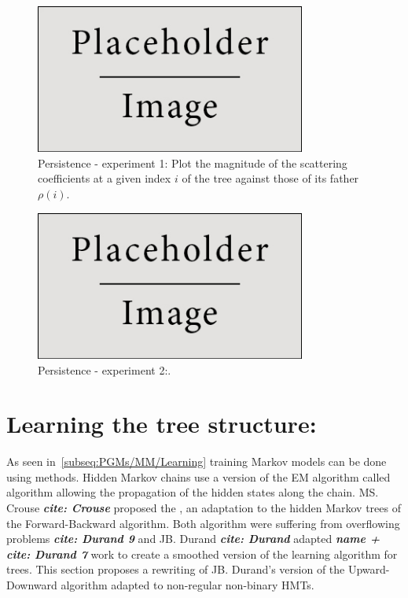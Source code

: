 \documentclass[a4paper,11pt]{report}
\begin{document}
{		\begin{figure}
				\begin{center}
					\includegraphics[width=3.5in]{placeholder.jpg}
					\caption[Persistence - experiment 1.]{Persistence - experiment 1: Plot the magnitude of the scattering coefficients at a given index $i$ of the tree against those of its father $\rho(i)$.} %
					\label{fig:Persistence - 1}
				\end{center}
		\end{figure} 
		
		\begin{figure}
				\begin{center}
					\includegraphics[width=3.5in]{placeholder.jpg}
					\caption[Persistence - experiment 2.]{Persistence - experiment 2:.} %
					\label{fig:Persistence - 2}
				\end{center}
		\end{figure}
		
		
  \section{Learning the tree structure:}
    \label{seq:SHMT/Learning}
    
    As seen in~\ref{subseq:PGMs/MM/Learning} training Markov  models can be done using  methods. Hidden Markov chains use a version of the EM algorithm called  algorithm allowing the propagation of the hidden states along the chain. MS. Crouse \textbf{\textit{cite: Crouse}} proposed the , an adaptation to the hidden Markov trees of the Forward-Backward algorithm. Both algorithm were suffering from overflowing problems \textbf{\textit{cite: Durand 9 }} and JB. Durand \textbf{\textit{cite: Durand}} adapted \textbf{\textit{name + cite: Durand 7}} work to create a smoothed version of the learning algorithm for trees. This section proposes a rewriting of JB. Durand's version of the Upward-Downward algorithm adapted to non-regular non-binary HMTs.\\
       
}
\end{document}

